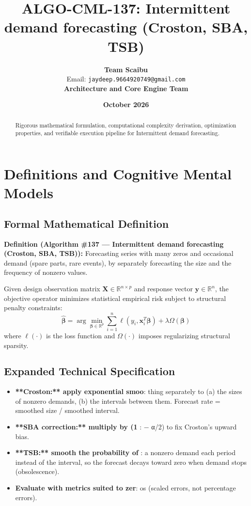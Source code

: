 \documentclass[11pt,a4paper]{article}
\title{\textbf{ALGO-CML-137: Intermittent demand forecasting (Croston, SBA, TSB)}}
\author{\textbf{Team Scaibu} \\ \small Email: \texttt{jaydeep.9664920749@gmail.com} \\ \small \textbf{Architecture and Core Engine Team}}
\date{\textbf{October 2026}}
\theoremstyle{definition}
\begin{document}
\maketitle

\begin{abstract}
Rigorous mathematical formulation, computational complexity derivation, optimization properties, and verifiable execution pipeline for Intermittent demand forecasting.
\end{abstract}

\section{Definitions and Cognitive Mental Models}

\subsection{Formal Mathematical Definition}
\textbf{Definition (Algorithm \#137 --- Intermittent demand forecasting (Croston, SBA, TSB)):}
Forecasting series with many zeros and occasional demand (spare parts, rare events), by separately forecasting the size and the frequency of nonzero values.

Given design observation matrix $\mathbf{X} \in \mathbb{R}^{n \times p}$ and response vector $\mathbf{y} \in \mathbb{R}^n$, the objective operator minimizes statistical empirical risk subject to structural penalty constraints:
\begin{equation}
\hat{\boldsymbol{\beta}} = \arg\min_{\boldsymbol{\beta} \in \mathbb{R}^p} \sum_{i=1}^n \ell(y_i, \mathbf{x}_i^T \boldsymbol{\beta}) + \lambda \Omega(\boldsymbol{\beta})
\end{equation}
where $\ell(\cdot)$ is the loss function and $\Omega(\cdot)$ imposes regularizing structural sparsity.

\subsection{Expanded Technical Specification}
\begin{itemize}
\item \textbf{**Croston:** apply exponential smoo}: thing separately to (a) the sizes of nonzero demands, (b) the intervals between them. Forecast rate = smoothed size / smoothed interval.
\item \textbf{**SBA correction:** multiply by (1 }: − α/2) to fix Croston's upward bias.
\item \textbf{**TSB:** smooth the probability of }: a nonzero demand each period instead of the interval, so the forecast decays toward zero when demand stops (obsolescence).
\item \textbf{Evaluate with metrics suited to zer}: os (scaled errors, not percentage errors).
\end{itemize}
\end{document}
